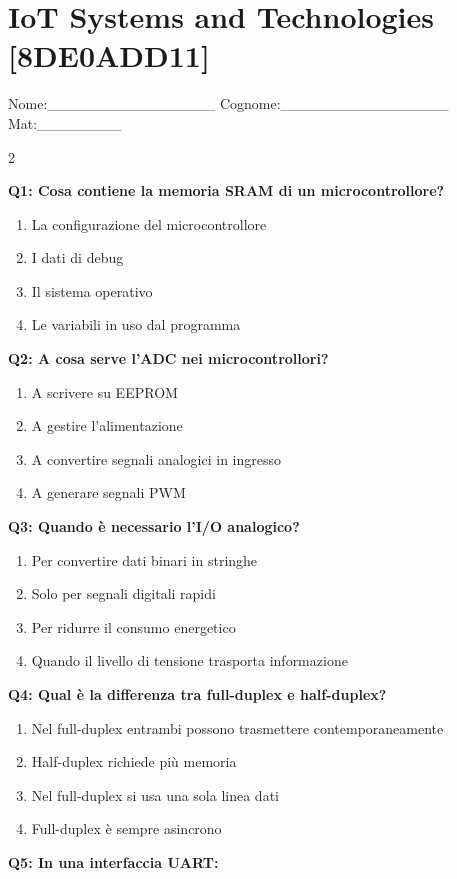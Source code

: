 \documentclass[10pt]{article}
\begin{document}
\section*{IoT Systems and Technologies \footnotesize [8DE0ADD11]}
{\footnotesize Nome:\_\_\_\_\_\_\_\_\_\_\_\_\_\_\_\_ Cognome:\_\_\_\_\_\_\_\_\_\_\_\_\_\_\_\_ Mat:\_\_\_\_\_\_\_\_}
\begin{multicols}{2}

\textbf{Q1: Cosa contiene la memoria SRAM di un microcontrollore?}

\begin{enumerate}[label=\arabic*.]
\item La configurazione del microcontrollore
\item I dati di debug
\item Il sistema operativo
\item Le variabili in uso dal programma
\end{enumerate}
\textbf{Q2: A cosa serve l'ADC nei microcontrollori?}

\begin{enumerate}[label=\arabic*.]
\item A scrivere su EEPROM
\item A gestire l’alimentazione
\item A convertire segnali analogici in ingresso
\item A generare segnali PWM
\end{enumerate}
\textbf{Q3: Quando è necessario l’I/O analogico?}

\begin{enumerate}[label=\arabic*.]
\item Per convertire dati binari in stringhe
\item Solo per segnali digitali rapidi
\item Per ridurre il consumo energetico
\item Quando il livello di tensione trasporta informazione
\end{enumerate}
\textbf{Q4: Qual è la differenza tra full-duplex e half-duplex?}

\begin{enumerate}[label=\arabic*.]
\item Nel full-duplex entrambi possono trasmettere contemporaneamente
\item Half-duplex richiede più memoria
\item Nel full-duplex si usa una sola linea dati
\item Full-duplex è sempre asincrono
\end{enumerate}
\textbf{Q5: In una interfaccia UART:}


\end{multicols}
\end{document}
